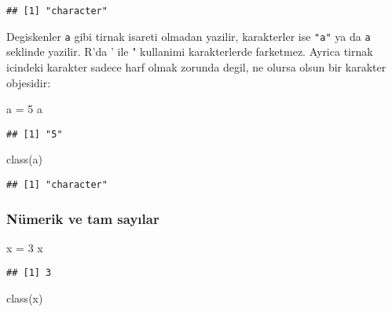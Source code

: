 \documentclass[
]{book}
\newenvironment{Shaded}{\begin{snugshade}}{\end{snugshade}}
\newcommand{\DecValTok}[1]{\textcolor[rgb]{0.00,0.00,0.81}{#1}}
\newcommand{\FunctionTok}[1]{\textcolor[rgb]{0.00,0.00,0.00}{#1}}
\newcommand{\NormalTok}[1]{#1}
\newcommand{\OtherTok}[1]{\textcolor[rgb]{0.56,0.35,0.01}{#1}}
\newcommand{\StringTok}[1]{\textcolor[rgb]{0.31,0.60,0.02}{#1}}
\begin{document}
\begin{verbatim}
## [1] "character"
\end{verbatim}

Degiskenler \texttt{a} gibi tirnak isareti olmadan yazilir, karakterler ise \texttt{"a"} ya da \texttt{\textquotesingle{}a\textquotesingle{}} seklinde yazilir. R'da ' ile " kullanimi karakterlerde farketmez. Ayrica tirnak icindeki karakter sadece harf olmak zorunda degil, ne olursa olsun bir karakter objesidir:

\begin{Shaded}
\begin{Highlighting}[]
\NormalTok{a }\OtherTok{=} \StringTok{\textquotesingle{}5\textquotesingle{}}
\NormalTok{a}
\end{Highlighting}
\end{Shaded}

\begin{verbatim}
## [1] "5"
\end{verbatim}

\begin{Shaded}
\begin{Highlighting}[]
\FunctionTok{class}\NormalTok{(a)}
\end{Highlighting}
\end{Shaded}

\begin{verbatim}
## [1] "character"
\end{verbatim}

\hypertarget{nuxfcmerik-ve-tam-sayux131lar}{%
\subsubsection{Nümerik ve tam sayılar}\label{nuxfcmerik-ve-tam-sayux131lar}}

\begin{Shaded}
\begin{Highlighting}[]
\NormalTok{x }\OtherTok{=} \DecValTok{3} 
\NormalTok{x}
\end{Highlighting}
\end{Shaded}

\begin{verbatim}
## [1] 3
\end{verbatim}

\begin{Shaded}
\begin{Highlighting}[]
\FunctionTok{class}\NormalTok{(x)}
\end{Highlighting}
\end{Shaded}
\end{document}
